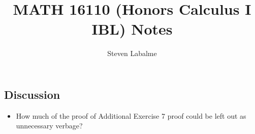 \documentclass[titlepage]{article}
\title{MATH 16110 (Honors Calculus I IBL) Notes}
\author{Steven Labalme}
\begin{document}
\maketitle



\tableofcontents
\listoffigures
\newpage



\pagestyle{main}

\newpage



\setcounter{secnumdepth}{3}



\subsection{Discussion}
\begin{itemize}
    \item How much of the proof of Additional Exercise 7 proof could be left out as unnecessary verbage?
\end{itemize}
\newpage




\end{document}
